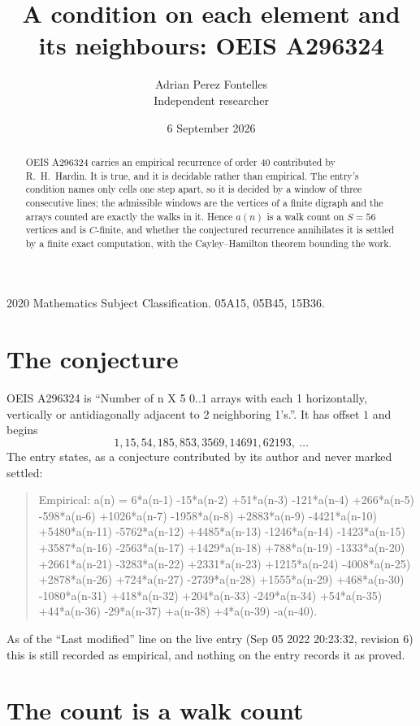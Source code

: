 \documentclass[11pt,a4paper]{article}
\title{A condition on each element and its neighbours: OEIS A296324}
\author{Adrian Perez Fontelles\\ \small Independent researcher}
\date{6 September 2026}
\theoremstyle{plain}
\theoremstyle{definition}
\begin{document}
\maketitle

\begin{abstract}
OEIS A296324 carries an empirical recurrence of order $40$ contributed by R.~H.~Hardin. It is
true, and it is decidable rather than empirical. The entry's condition names only cells one step apart, so it is decided by a window of
three consecutive lines; the
admissible windows are the vertices of a finite digraph and the arrays counted are exactly the
walks in it. Hence $a(n)$ is a walk count on $S=56$ vertices and is $C$-finite, and whether the
conjectured recurrence annihilates it is settled by a finite exact computation, with the
Cayley--Hamilton theorem bounding the work.
\end{abstract}

\noindent\small 2020 Mathematics Subject Classification. 05A15, 05B45, 15B36.\normalsize

\section{The conjecture}

OEIS A296324 is ``Number of n X 5 0..1 arrays with each 1 horizontally, vertically or antidiagonally adjacent to 2 neighboring 1's.''. It has offset $1$ and begins
\[
1, 15, 54, 185, 853, 3569, 14691, 62193,\ \dots
\]
The entry states, as a conjecture contributed by its author and never marked settled:
\begin{quote}
Empirical: a(n) = 6*a(n-1) -15*a(n-2) +51*a(n-3) -121*a(n-4) +266*a(n-5) -598*a(n-6) +1026*a(n-7) -1958*a(n-8) +2883*a(n-9) -4421*a(n-10) +5480*a(n-11) -5762*a(n-12) +4485*a(n-13) -1246*a(n-14) -1423*a(n-15) +3587*a(n-16) -2563*a(n-17) +1429*a(n-18) +788*a(n-19) -1333*a(n-20) +2661*a(n-21) -3283*a(n-22) +2331*a(n-23) +1215*a(n-24) -4008*a(n-25) +2878*a(n-26) +724*a(n-27) -2739*a(n-28) +1555*a(n-29) +468*a(n-30) -1080*a(n-31) +418*a(n-32) +204*a(n-33) -249*a(n-34) +54*a(n-35) +44*a(n-36) -29*a(n-37) +a(n-38) +4*a(n-39) -a(n-40).
\end{quote}
As of the ``Last modified'' line on the live entry (Sep 05 2022 20:23:32, revision 6) this is still
recorded as empirical, and nothing on the entry records it as proved.

\section{The count is a walk count}
\end{document}
